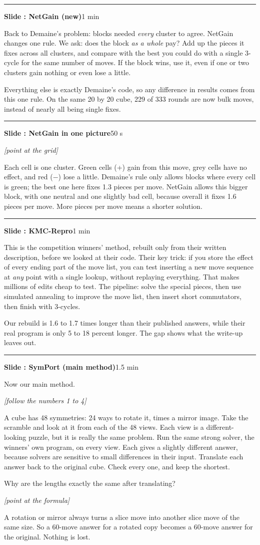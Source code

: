 \documentclass[11pt,a4paper]{article}
\newcounter{slide}
\newcommand{\slide}[2]{\par\bigskip\stepcounter{slide}%
  {\color{NavyBlue}\rule{\linewidth}{0.4pt}}\par
  \textbf{\large Slide \arabic{slide}: #1}\hfill{\small\color{gray}#2}\par}
\newcommand{\act}[1]{\par{\small\color{OliveGreen}\textit{[#1]}}\par}
\begin{document}
\slide{NetGain (new)}{1 min}
Back to Demaine's problem: blocks needed \emph{every} cluster to agree. NetGain changes one rule.
We ask: does the block \emph{as a whole} pay? Add up the pieces it fixes across all clusters, and compare with the best you could
do with a single 3-cycle for the same number of moves. If the block wins, use it, even if one or two clusters gain nothing or
even lose a little.

Everything else is exactly Demaine's code, so any difference in results comes from this one rule. On the same 20 by 20 cube,
229 of 333 rounds are now bulk moves, instead of nearly all being single fixes.

\slide{NetGain in one picture}{50 s}
\act{point at the grid} Each cell is one cluster. Green cells (+) gain from this move, grey cells have no effect, and red ($-$) lose a little.
Demaine's rule only allows blocks where every cell is green; the best one here fixes 1.3 pieces per move.
NetGain allows this bigger block, with one neutral and one slightly bad cell, because overall it fixes 1.6 pieces per move.
More pieces per move means a shorter solution.

\slide{KMC-Repro}{1 min}
This is the competition winners' method, rebuilt only from their written description, before we looked at their code.
Their key trick: if you store the effect of every ending part of the move list, you can test inserting a new move sequence at
\emph{any} point with a single lookup, without replaying everything. That makes millions of edits cheap to test.
The pipeline: solve the special pieces, then use simulated annealing to improve the move list, then insert short commutators,
then finish with 3-cycles.

Our rebuild is 1.6 to 1.7 times longer than their published answers, while their real program is only 5 to 18 percent longer. The
gap shows what the write-up leaves out.

\slide{SymPort (main method)}{1.5 min}
Now our main method. \act{follow the numbers 1 to 4}
A cube has 48 symmetries: 24 ways to rotate it, times a mirror image. Take the scramble and look at it from each of the 48
views. Each view is a different-looking puzzle, but it is really the same problem.
Run the same strong solver, the winners' own program, on every view. Each gives a slightly different answer, because solvers are
sensitive to small differences in their input.
Translate each answer back to the original cube. Check every one, and keep the shortest.

Why are the lengths exactly the same after translating? \act{point at the formula}
A rotation or mirror always turns a slice move into another slice move of the same size. So a 60-move answer for a rotated
copy becomes a 60-move answer for the original. Nothing is lost.
\end{document}
